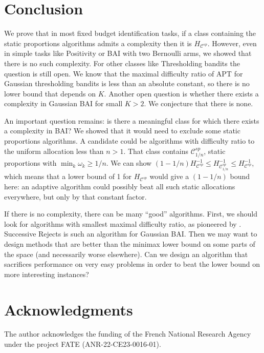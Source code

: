 \documentclass{article}
\begin{document}
\section{Conclusion}
\label{sec:conclusion}

We prove that in most fixed budget identification tasks, if a class containing the static proportions algorithms admits a complexity then it is $H_{\mathcal C^{sp}}$.
However, even in simple tasks like Positivity or BAI with two Bernoulli arms, we showed that there is no such complexity.
For other classes like Thresholding bandits the question is still open. We know that the maximal difficulty ratio of APT \cite{locatelli2016optimal,ouhamma2021online} for Gaussian thresholding bandits is less than an absolute constant, so there is no lower bound that depends on $K$. Another open question is whether there exists a complexity in Gaussian BAI for small $K>2$. We conjecture that there is none.

An important question remains: is there a meaningful class for which there exists a complexity in BAI?
We showed that it would need to exclude some static proportions algorithms. A candidate could be algorithms with difficulty ratio to the uniform allocation less than $n>1$. That class contains $\mathcal C_{1/n}^{sp}$, static proportions with $\min_k \omega_k \ge 1/n$.
We can show $(1 - 1/n) H_{\mathcal C^{sp}}^{-1} \le H_{\mathcal C^{sp}_{1/n}}^{-1} \le H_{\mathcal C^{sp}}^{-1}$, which means that a lower bound of 1 for $H_{\mathcal C^{sp}}$ would give a $(1 - 1/n)$ bound here: an adaptive algorithm could possibly beat all such static allocations everywhere, but only by that constant factor.

If there is no complexity, there can be many ``good'' algorithms. First, we should look for algorithms with smallest maximal difficulty ratio, as pioneered by \cite{komiyama2022minimax}. Successive Rejects is such an algorithm for Gaussian BAI. Then we may want to design methods that are better than the minimax lower bound on some parts of the space (and necessarily worse elsewhere). Can we design an algorithm that sacrifices performance on very easy problems in order to beat the lower bound on more interesting instances?

\section*{Acknowledgments}

The author acknowledges the funding of the French National Research Agency under the project FATE (ANR-22-CE23-0016-01).
\end{document}
